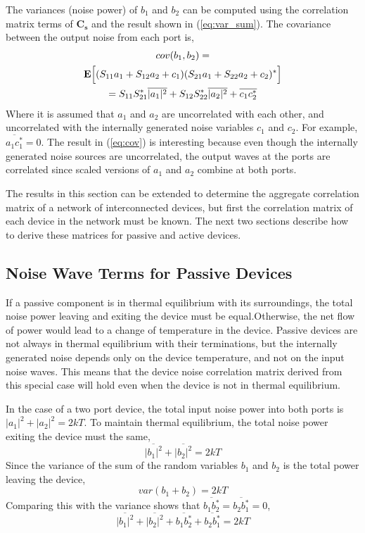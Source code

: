 \documentclass[journal]{IEEEtran}
\begin{document}
The variances (noise power) of \(b_1\) and \(b_2\) can be computed using the correlation matrix terms of \(\mathbf{C_s}\) and the result shown in (\ref{eq:var_sum}). The covariance between the output noise from each port is,
%
\begin{gather}
cov(b_1, b_2) = \notag \\
\mathbf{E}\Big[(S_{11}a_1 + S_{12}a_2 + c_1)(S_{21}a_1 + S_{22}a_2 + c_2)^*\Big] \notag\\
= S_{11}S_{21}^*\overline{|a_1|^2} + S_{12}S_{22}^*\overline{|a_2|^2} + \overline{c_1c_2^*} \label{eq:cov}
\end{gather}
%
Where it is assumed that \(a_1\) and \(a_2\) are uncorrelated with each other, and uncorrelated with the internally generated noise variables \(c_1\) and \(c_2\). For example, \(\overline{a_1c_1^*}= 0\). The result in (\ref{eq:cov}) is interesting because even though the internally generated noise sources are uncorrelated, the output waves at the ports are correlated since scaled versions of \(a_1\) and \(a_2\) combine at both ports.

The results in this section can be extended to determine the aggregate correlation matrix of a network of interconnected devices, but first the correlation matrix of each device in the network must be known. The next two sections describe how to derive these matrices for passive and active devices.

\subsection{Noise Wave Terms for Passive Devices}
If a passive component is in thermal equilibrium with its surroundings, the total noise power leaving and exiting the device must be equal.Otherwise, the net flow of power would lead to a change of temperature in the device. Passive devices are not always in thermal equilibrium with their terminations, but the internally generated noise depends only on the device temperature, and not on the input noise waves. This means that the device noise correlation matrix derived from this special case will hold even when the device is not in thermal equilibrium.

In the case of a two port device, the total input noise power into both ports is \(|a_1|^2 + |a_2|^2 = 2kT\). To maintain thermal equilibrium, the total noise power exiting the device must the same, 
\[\overline{|b_1|^2} + \overline{|b_2|^2} = 2kT\]
%
Since the variance of the sum of the random variables \(b_1\) and \(b_2\) is the total power leaving the device, \cite{b6}
\[var(b_1 + b_2) = 2kT\]
%
Comparing this with the variance shows that \(\overline{b_1 b_2^*} = \overline{b_2 b_1^*} = 0\),
\[\overline{|b_1|^2} + \overline{|b_2|^2} + \overline{b_1 b_2^*} + \overline{b_2 b_1^*} = 2kT\]
%
\end{document}
